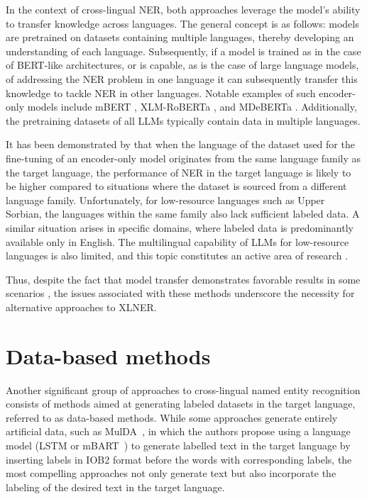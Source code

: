 In the context of cross-lingual NER, both approaches leverage the model's ability to transfer knowledge
across languages. The general concept is as follows: models are pretrained on datasets containing
multiple languages, thereby developing an understanding of each language. Subsequently, if a model
is trained as in the case of BERT-like architectures, or is capable, as is the case of large language models,
of addressing the NER problem in one language it can subsequently transfer this knowledge to tackle
NER in other languages. Notable examples of such encoder-only models include mBERT
\cite{devlin-etal-2019-bert}, XLM-RoBERTa \cite{conneau-etal-2020-unsupervised-xlmr}, and
MDeBERTa \cite{He2020DeBERTaDB,He2021DeBERTaV3ID}. Additionally, the pretraining datasets
of all LLMs typically \cite{touvron2023llama2openfoundation} contain data in multiple languages.

It has been demonstrated by \cite{torge-etal-2023-named} that when the language of the dataset used for the
fine-tuning of an encoder-only model originates from the same language family as the target
language, the performance of NER in the target language is likely to be higher compared to situations
where the dataset is sourced from a different language family. Unfortunately, for low-resource
languages such as Upper Sorbian, the languages within the same family also lack sufficient labeled data.
A similar situation arises in specific domains, where labeled data is predominantly available only in English.
The multilingual capability of LLMs for low-resource languages is also limited,
and this topic constitutes an active area of research \cite{lai-etal-2024-llms}.

Thus, despite the fact that model transfer demonstrates favorable results in some
scenarios \cite{garcia-ferrero-etal-2022-model}, the issues associated with these methods
underscore the necessity for alternative approaches to XLNER.

\section{Data-based methods}

Another significant group of approaches to cross-lingual named entity recognition consists of methods
aimed at generating labeled datasets in the target language, referred to as data-based methods.
While some approaches generate entirely artificial data, such as MulDA~\cite{liu-etal-2021-mulda},
in which the authors propose using a language model (LSTM \cite{lstm} or
mBART~\cite{liu-etal-2020-multilingual-denoising}) to generate labelled text in the target language by
inserting labels in IOB2 format before the words with corresponding labels, the most compelling approaches
not only generate text but also incorporate the labeling of the desired text in the target language.

